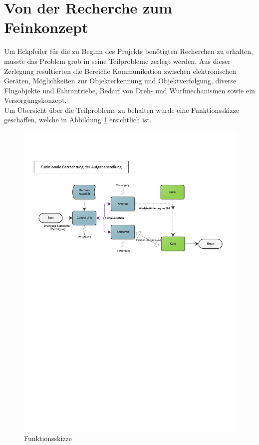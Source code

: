 \section{Von der Recherche zum Feinkonzept}
Um Eckpfeiler für die zu Beginn des Projekts benötigten Recherchen zu erhalten, musste das
Problem grob in seine Teilprobleme zerlegt werden. Aus dieser Zerlegung resultierten die
Bereiche Kommunikation zwischen elektronischen Geräten, Möglichkeiten zur Objekterkennung und
Objektverfolgung, diverse Flugobjekte und Fahrantriebe, Bedarf von Dreh- und Wurfmechanismen
sowie ein Versorgungskonzept. \\
Um Übersicht über die Teilprobleme zu behalten wurde eine Funktionsskizze geschaffen, welche
in  Abbildung \ref{fig:Funktionsskizze} ersichtlich ist.\\
\begin{figure}[h!]
	\centering
	\includegraphics[scale=0.73,clip,trim= 14mm 17.8cm 12mm 50mm]
	{Enddokumentation/Varianten/Bilder/Funktionsskizze.pdf}
	\caption{Funktionsskizze}
	\label{fig:Funktionsskizze}
\end{figure}
